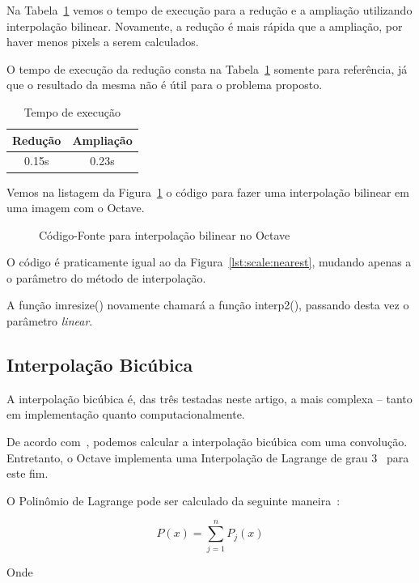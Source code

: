 \documentclass[12pt]{article}
\begin{document}
Na Tabela~\ref{tab:bilinear} vemos o tempo de execução para a redução e a ampliação utilizando interpolação bilinear. Novamente, a redução é mais rápida que a ampliação, por haver menos pixels a serem calculados.

O tempo de execução da redução consta na Tabela~\ref{tab:bilinear} somente para referência, já que o resultado da mesma não é útil para o problema proposto.

\begin{table}[H]
    \caption{Tempo de execução}
    \centering
    \label{tab:bilinear}
    \begin{tabular}{c||c}
     Redução & Ampliação \\
     \hline
     0.15s & 0.23s
    \end{tabular}
\end{table}

Vemos na listagem da Figura~\ref{lst:scale:linear} o código para fazer uma interpolação bilinear em uma imagem com o Octave.

\begin{figure}[H]

\caption{Código-Fonte para interpolação bilinear no Octave}
\label{lst:scale:linear}
\end{figure}

O código é praticamente igual ao da Figura~\ref{lst:scale:nearest}, mudando apenas a o parâmetro do método de interpolação.

A função \textsf{imresize()} novamente chamará a função \textsf{interp2()}, passando desta vez o parâmetro \emph{linear}.


\subsection{Interpolação Bicúbica}\label{sec:redimensionamento:bicubica}

A interpolação bicúbica é, das três testadas neste artigo, a mais complexa -- tanto em implementação quanto computacionalmente.~\cite{han2013}

De acordo com~\cite{keys:1981}, podemos calcular a interpola\c{c}ão bicúbica com uma convolu\c{c}ão. Entretanto, o Octave implementa uma Interpolação de Lagrange de grau 3~\cite{eaton:2008} para este fim.

O Polinômio de Lagrange pode ser calculado da seguinte maneira~\cite{eaton:2008}:

\[
  P(x) = \sum^{n}_{j=1}P_j(x)
\]

Onde
\end{document}
